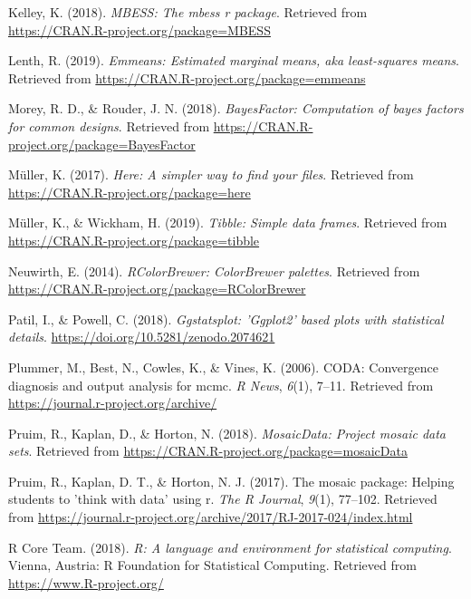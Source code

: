 \documentclass[man]{apa6}
\begin{document}
\leavevmode\hypertarget{ref-R-MBESS}{}%
Kelley, K. (2018). \emph{MBESS: The mbess r package}. Retrieved from \url{https://CRAN.R-project.org/package=MBESS}

\leavevmode\hypertarget{ref-R-emmeans}{}%
Lenth, R. (2019). \emph{Emmeans: Estimated marginal means, aka least-squares means}. Retrieved from \url{https://CRAN.R-project.org/package=emmeans}

\leavevmode\hypertarget{ref-R-BayesFactor}{}%
Morey, R. D., \& Rouder, J. N. (2018). \emph{BayesFactor: Computation of bayes factors for common designs}. Retrieved from \url{https://CRAN.R-project.org/package=BayesFactor}

\leavevmode\hypertarget{ref-R-here}{}%
Müller, K. (2017). \emph{Here: A simpler way to find your files}. Retrieved from \url{https://CRAN.R-project.org/package=here}

\leavevmode\hypertarget{ref-R-tibble}{}%
Müller, K., \& Wickham, H. (2019). \emph{Tibble: Simple data frames}. Retrieved from \url{https://CRAN.R-project.org/package=tibble}

\leavevmode\hypertarget{ref-R-RColorBrewer}{}%
Neuwirth, E. (2014). \emph{RColorBrewer: ColorBrewer palettes}. Retrieved from \url{https://CRAN.R-project.org/package=RColorBrewer}

\leavevmode\hypertarget{ref-R-ggstatsplot}{}%
Patil, I., \& Powell, C. (2018). \emph{Ggstatsplot: 'Ggplot2' based plots with statistical details}. \url{https://doi.org/10.5281/zenodo.2074621}

\leavevmode\hypertarget{ref-R-coda}{}%
Plummer, M., Best, N., Cowles, K., \& Vines, K. (2006). CODA: Convergence diagnosis and output analysis for mcmc. \emph{R News}, \emph{6}(1), 7--11. Retrieved from \url{https://journal.r-project.org/archive/}

\leavevmode\hypertarget{ref-R-mosaicData}{}%
Pruim, R., Kaplan, D., \& Horton, N. (2018). \emph{MosaicData: Project mosaic data sets}. Retrieved from \url{https://CRAN.R-project.org/package=mosaicData}

\leavevmode\hypertarget{ref-R-mosaic}{}%
Pruim, R., Kaplan, D. T., \& Horton, N. J. (2017). The mosaic package: Helping students to 'think with data' using r. \emph{The R Journal}, \emph{9}(1), 77--102. Retrieved from \url{https://journal.r-project.org/archive/2017/RJ-2017-024/index.html}

\leavevmode\hypertarget{ref-R-base}{}%
R Core Team. (2018). \emph{R: A language and environment for statistical computing}. Vienna, Austria: R Foundation for Statistical Computing. Retrieved from \url{https://www.R-project.org/}
\end{document}
